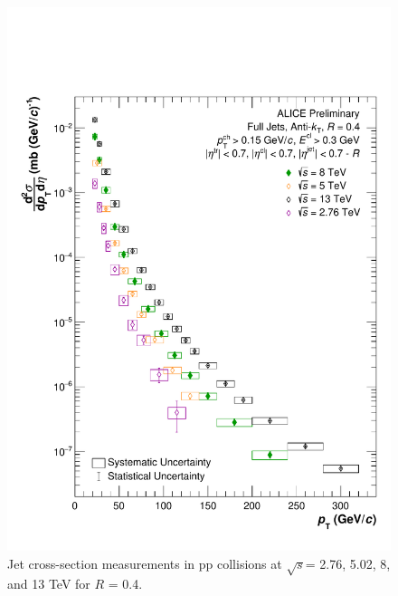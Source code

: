 \documentclass[ALICE]{ALICE_analysis_notes}
\newcommand{\s}{$\sqrt{s}$\xspace}
\newcommand{\pp}{pp\xspace}
\begin{document}
\begin{appendix}
\begin{figure}[h!]
    \centering
    \includegraphics[width=15cm]{figures/EnergyComparisons/SpectrumComparison_R04.pdf}
    \caption{Jet cross-section measurements in \pp collisions at \s = 2.76, 5.02, 8, and 13 TeV for $R$ = 0.4.}
    \label{fig:appSpecCompareR04}
\end{figure}


\end{appendix}
\end{document}
